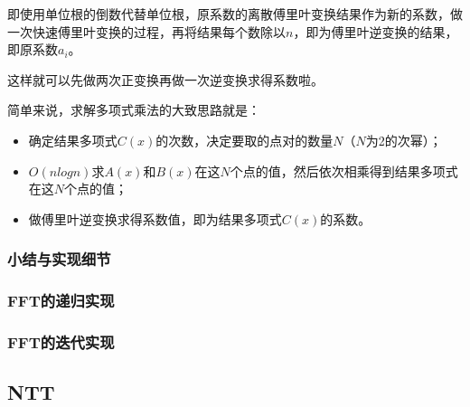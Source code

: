 即{\heiti 使用单位根的倒数代替单位根，原系数的离散傅里叶变换结果作为新的系数，做一次快速傅里叶变换的过程，再将结果每个数除以$n$}，即为傅里叶逆变换的结果，即原系数$a_i$。

这样就可以先做两次正变换再做一次逆变换求得系数啦。

简单来说，求解多项式乘法的大致思路就是：

\begin{itemize}
\item 确定结果多项式$C(x)$的次数，决定要取的点对的数量$N$（$N$为2的次幂）；
\item $O(nlogn)$求$A(x)$和$B(x)$在这$N$个点的值，然后依次相乘得到结果多项式在这$N$个点的值；  
\item 做傅里叶逆变换求得系数值，即为结果多项式$C(x)$的系数。
\end{itemize}

\subsubsection{小结与实现细节}

\subsubsection{FFT的递归实现}

\subsubsection{FFT的迭代实现}

\subsection{NTT}







